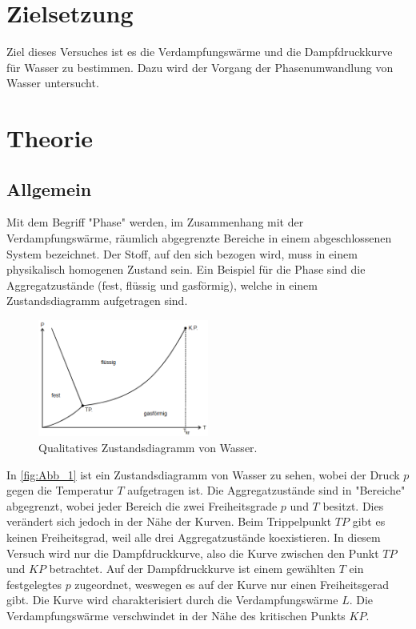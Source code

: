 \section{Zielsetzung}
\label{sec: Zielsetzung}
Ziel dieses Versuches ist es die Verdampfungswärme und die Dampfdruckkurve für Wasser zu bestimmen. 
Dazu wird der Vorgang der Phasenumwandlung von Wasser untersucht.

\section{Theorie}
\label{sec:Theorie}
\subsection{Allgemein} %
\label{sub:Allgemein}
Mit dem Begriff "Phase" werden, im Zusammenhang mit der Verdampfungswärme, räumlich abgegrenzte Bereiche in einem abgeschlossenen System bezeichnet.
Der Stoff, auf den sich bezogen wird, muss in einem physikalisch homogenen Zustand sein. 
Ein Beispiel für die Phase sind die Aggregatzustände (fest, flüssig und gasförmig), welche in einem Zustandsdiagramm aufgetragen sind.
\begin{figure}[H]
    \centering
    \includegraphics[width=0.5\textwidth]{build/Abb_1.PNG}
    \caption {Qualitatives Zustandsdiagramm von Wasser.\cite{V203}}
    \label{fig:Abb_1}
\end{figure}
In \autoref{fig:Abb_1} ist ein Zustandsdiagramm von Wasser zu sehen, wobei der Druck $p$ gegen die Temperatur $T$ aufgetragen ist.
Die Aggregatzustände sind in "Bereiche" abgegrenzt, wobei jeder Bereich die zwei Freiheitsgrade $p$ und $T$ besitzt.
Dies verändert sich jedoch in der Nähe der Kurven. 
Beim Trippelpunkt $TP$ gibt es keinen Freiheitsgrad, weil alle drei Aggregatzustände koexistieren.
In diesem Versuch wird nur die Dampfdruckkurve, also die Kurve zwischen den Punkt $TP$ und $KP$ betrachtet.
Auf der Dampfdruckkurve ist einem gewählten $T$ ein festgelegtes $p$ zugeordnet, weswegen es auf der Kurve nur einen Freiheitsgerad gibt. Die Kurve wird charakterisiert durch die Verdampfungswärme $L$.
Die Verdampfungswärme verschwindet in der Nähe des kritischen Punkts $KP$.

